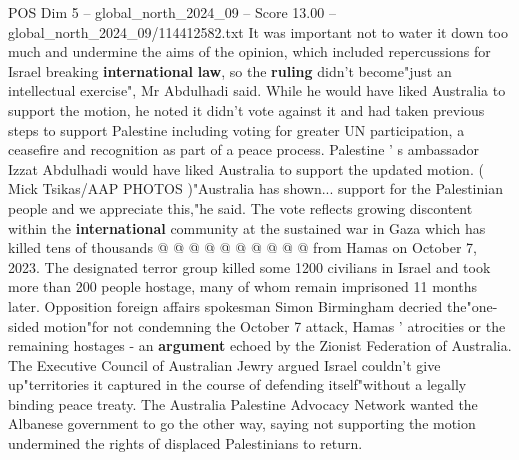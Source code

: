 \begin{textsample}{POS Dim 5 – global\_north\_2024\_09 – Score 13.00 – global\_north\_2024\_09/114412582.txt}
It was important not to water it down too much and undermine the aims of the opinion, which included repercussions for Israel breaking \textbf{international} \textbf{law}, so the \textbf{ruling} didn't become"just an intellectual exercise", Mr Abdulhadi said.
While he would have liked Australia to support the motion, he noted it didn't vote against it and had taken previous steps to support Palestine including voting for greater UN participation, a ceasefire and recognition as part of a peace process.
Palestine ' s ambassador Izzat Abdulhadi would have liked Australia to support the updated motion. ( Mick Tsikas/AAP PHOTOS )"Australia has shown... support for the Palestinian people and we appreciate this,"he said.
The vote reflects growing discontent within the \textbf{international} community at the sustained war in Gaza which has killed tens of thousands @ @ @ @ @ @ @ @ @ @ from Hamas on October 7, 2023.
The designated terror group killed some 1200 civilians in Israel and took more than 200 people hostage, many of whom remain imprisoned 11 months later.
Opposition foreign affairs spokesman Simon Birmingham decried the"one-sided motion"for not condemning the October 7 attack, Hamas ' atrocities or the remaining hostages - an \textbf{argument} echoed by the Zionist Federation of Australia.
The Executive Council of Australian Jewry argued Israel couldn't give up"territories it captured in the course of defending itself"without a legally binding peace treaty.
The Australia Palestine Advocacy Network wanted the Albanese government to go the other way, saying not supporting the motion undermined the rights of displaced Palestinians to return.

\end{textsample}
